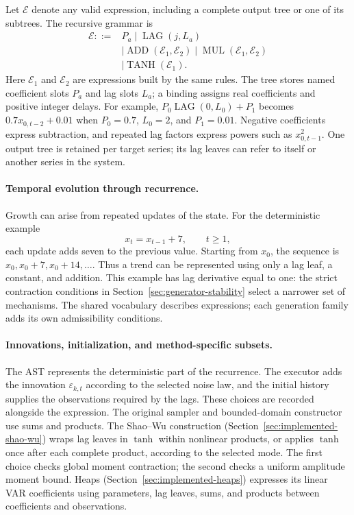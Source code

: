 Let $\mathcal E$ denote any valid expression, including a complete output
tree or one of its subtrees. The recursive grammar is
\begin{equation}
\begin{aligned}
\mathcal E ::= {}& P_a \mid \operatorname{LAG}(j,L_a)\\
 &\mid\operatorname{ADD}(\mathcal E_1,\mathcal E_2)
  \mid\operatorname{MUL}(\mathcal E_1,\mathcal E_2)\\
 &\mid\operatorname{TANH}(\mathcal E_1).
\end{aligned}
\label{eq:generator-vocabulary-grammar}
\end{equation}
Here $\mathcal E_1$ and $\mathcal E_2$ are expressions built by the same rules.
The tree stores named coefficient slots $P_a$ and lag slots $L_a$; a binding
assigns real coefficients and positive integer delays. For example,
$P_0\operatorname{LAG}(0,L_0)+P_1$ becomes
$0.7x_{0,t-2}+0.01$ when $P_0=0.7$, $L_0=2$, and $P_1=0.01$.
Negative coefficients express subtraction, and repeated lag factors express
powers such as $x_{0,t-1}^2$. One output tree is retained per target series;
its lag leaves can refer to itself or another series in the system.

\paragraph{Temporal evolution through recurrence.}
Growth can arise from repeated updates of the state. For the deterministic
example
\begin{equation}
 x_t=x_{t-1}+7,\qquad t\geq1,
 \label{eq:generator-recurrent-trend}
\end{equation}
each update adds seven to the previous value. Starting from $x_0$, the
sequence is $x_0,x_0+7,x_0+14,\ldots$. Thus a trend can be represented using
only a lag leaf, a constant, and addition. This example has lag derivative
equal to one: the strict contraction conditions in
Section~\ref{sec:generator-stability} select a narrower set of mechanisms.
The shared vocabulary describes expressions; each generation family adds
its own admissibility conditions.

\paragraph{Innovations, initialization, and method-specific subsets.}
The AST represents the deterministic part of the recurrence. The executor
adds the innovation $\varepsilon_{k,t}$ according to the selected noise law,
and the initial history supplies the observations required by the lags.
These choices are recorded alongside the expression. The original sampler
and bounded-domain constructor use sums and products. The Shao--Wu
construction (Section~\ref{sec:implemented-shao-wu}) wraps lag leaves in
$\tanh$ within nonlinear products, or applies $\tanh$ once after each
complete product, according to the selected mode. The first choice checks
global moment contraction; the second checks a uniform amplitude moment
bound. Heaps
(Section~\ref{sec:implemented-heaps}) expresses its linear VAR coefficients
using parameters, lag leaves, sums, and products between coefficients and
observations.

